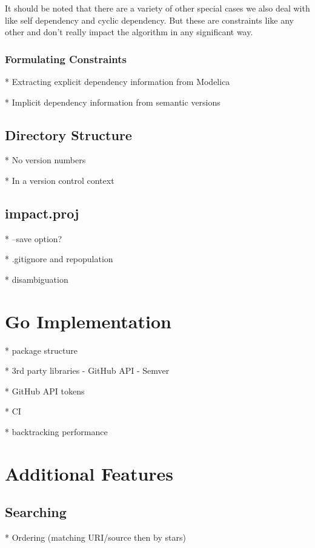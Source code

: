 \documentclass[11pt,a4paper,twocolumn]{article}
\begin{document}

It should be noted that there are a variety of other special cases we
also deal with like self dependency and cyclic dependency.  But these
are constraints like any other and don't really impact the algorithm
in any significant way.

\subsubsection{Formulating Constraints}
* Extracting explicit dependency information from Modelica

* Implicit dependency information from semantic versions

\subsection{Directory Structure}

* No version numbers

* In a version control context

\subsection{impact.proj}

* --save option?

* .gitignore and repopulation

* disambiguation

\section{Go Implementation}

* package structure

* 3rd party libraries
  - GitHub API
  - Semver

* GitHub API tokens

* CI

* backtracking performance

\section{Additional Features}

\subsection{Searching}

* Ordering (matching URI/source then by stars)  
\end{document}
